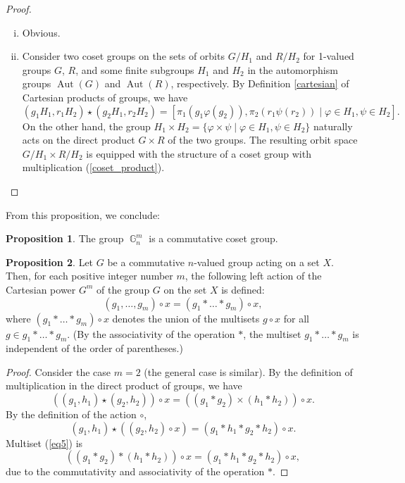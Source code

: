 \documentclass[14pt, dvipsnames]{extarticle}
\theoremstyle{definition}
\newtheorem{prop}{Proposition}
\theoremstyle{definition}
\theoremstyle{remark}
\let\phi\varphi
\DeclareMathOperator{\G}{\mathbb{G}}
\DeclareMathOperator{\Aut}{\mathrm{Aut}}
\begin{document}
\begin{proof}
\begin{enumerate}[(i)]
\item Obvious.

\item Consider two coset groups on the sets of orbits $G/H_1$ and $R/H_2$ for 1-valued groups $G$, $R$, and some finite subgroups $H_1$ and $H_2$ in the automorphism groups $\Aut(G)$ and $\Aut(R)$, respectively. By Definition \ref{cartesian} of Cartesian products of groups, we have
\begin{equation}\label{coset_product}
(g_1 H_1, r_1 H_2) \star (g_2 H_1, r_2 H_2) = \left[ \pi_1\left( g_1 \phi(g_2) \right), \pi_2\left( r_1 \psi(r_2) \right) \mid \phi \in H_1, \psi \in H_2 \right].
\end{equation}
On the other hand, the group $H_1 \times H_2 = \{\phi \times \psi \mid \phi \in H_1, \psi \in H_2\}$ naturally acts on the direct product $G \times R$ of the two groups. The resulting orbit space $G/H_1 \times R/H_2$ is equipped with the structure of a coset group with multiplication (\ref{coset_product}).
\end{enumerate}
\end{proof}

From this proposition, we conclude:

\begin{prop}
The group $\G_n^m$ is a commutative coset group.
\end{prop}

\begin{prop}\label{prop_action}
Let $G$ be a commutative $n$-valued group acting on a set $X$. Then, for each positive integer number $m$, the following left action of the Cartesian power $G^m$ of the group $G$ on the set $X$ is defined:
$$ (g_1, \dots, g_m) \circ x = (g_1\ast \dots\ast g_m) \circ x, $$
where $(g_1\ast \dots \ast g_m) \circ x$ denotes the union of the multisets $g \circ x$ for all $g \in g_1 \ast \dots \ast g_m$. (By the associativity of the operation $\ast$, the multiset $g_1 \ast \dots \ast g_m$ is independent of the order of parentheses.)
\end{prop}

\begin{proof}
Consider the case $m = 2$ (the general case is similar). By the definition of multiplication in the direct product of groups, we have
\begin{equation}\label{eq5}
((g_1, h_1) \star (g_2, h_2)) \circ x = ((g_1 \ast g_2) \times (h_1 \ast h_2)) \circ x.
\end{equation}
By the definition of the action $\circ$,
\begin{equation}
(g_1, h_1) \star ((g_2, h_2) \circ x) = (g_1 \ast h_1 \ast g_2 \ast h_2) \circ x.
\end{equation}
Multiset (\ref{eq5}) is
$$ ((g_1 \ast g_2) \ast (h_1 \ast h_2)) \circ x = (g_1 \ast h_1 \ast g_2 \ast h_2) \circ x, $$
due to the commutativity and associativity of the operation $\ast$.
\end{proof}
\end{document}
